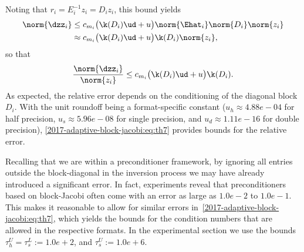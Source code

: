 Noting that $r_i = E_i^{-1}z_i = D_i z_i$, this bound yields
\begin{align}
  \norm{\dzz_i} &\le c_{m_i} \bigl(\k(D_i)\ud 
                 +  u\bigr) \norm{\Ehat_i} \norm{D_i} \norm{z_i}\nonumber\\
                &\approx c_{m_i} \bigl(\k(D_i)\ud 
                 +  u\bigr) \k(D_i) \norm{z_i},
                 \label{2017-adaptive-block-jacobi:eq:th6}
\end{align}
so that 
\begin{align}
 \frac{\norm{\dzz_i}}{\norm{z_i}}
  \le c_{m_i} \bigl(\k(D_i)\ud  +  u\bigr) \k(D_i).
   \label{2017-adaptive-block-jacobi:eq:th7}
\end{align}
As expected, the relative error depends on the conditioning of the diagonal 
block $D_i$. With the unit roundoff being a format-specific constant 
($u_h \approx 4.88e-04$ for half precision, $u_s \approx 5.96e-08$ for 
single precision, and $u_d\approx 1.11e-16$ for double precision),
\eqref{2017-adaptive-block-jacobi:eq:th7} provides bounds for the relative error.

Recalling that we are within a preconditioner framework, by ignoring all
entries outside the block-diagonal in the inversion process we may have
already introduced a significant error. In fact, experiments reveal that
preconditioners based on block-Jacobi often come with an error as large as
$1.0e-2$ to $1.0e-1$. This makes it reasonable to allow for similar errors
in~\eqref{2017-adaptive-block-jacobi:eq:th7}, which yields the bounds for the condition numbers that
are allowed in the respective formats.  In the experimental section we use
the bounds $\tau_h^U = \tau_s^L:=1.0e+2$, and $\tau_s^U := 1.0e+6$.


